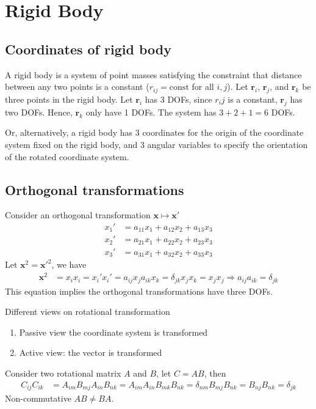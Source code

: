 \documentclass[twoside,9pt]{article}
\numberwithin{equation}{section} %
\theoremstyle{definition}
\theoremstyle{remark}
\begin{document}
\newpage 
\section{Rigid Body}
\subsection{Coordinates of rigid body}
A rigid body is a system of point masses satisfying the constraint that
distance between any two points is a constant ($r_{ij}=\text{const}$
for all $i,j$).
Let $\mathbf{r}_i$, $\mathbf{r}_j$, and $\mathbf{r}_k$
be three points in the rigid body.
Let $\mathbf{r}_i$ has $3$ DOFs, 
since $r_ij$ is a constant, $\mathbf{r}_j$ has two DOFs.
Hence, $\mathbf{r}_k$ only have 1 DOFs.
The system has $3+2+1=6$ DOFs.

Or, alternatively, a rigid body has 3 coordinates for the origin of the coordinate
system fixed on the rigid body, and 3 angular variables to specify the orientation
of the rotated coordinate system.

\subsection{Orthogonal transformations}
Consider an orthogonal transformation $\mathbf{x}\mapsto\mathbf{x}'$
\begin{align}
    x_1' &= a_{11}x_1 + a_{12}x_2 + a_{13}x_3\\
    x_2' &= a_{21}x_1 + a_{22}x_2 + a_{23}x_3\\
    x_3' &= a_{31}x_1 + a_{32}x_2 + a_{33}x_3
\end{align}
Let $\mathbf{x}^2=\mathbf{x'}^2$, we have
\begin{align}
    \mathbf{x}^2 &= x_ix_i
    = x_i' x_i'
    = a_{ij}x_j a_{ik}x_k
    = \delta_{jk}x_jx_k
    = x_jx_j
    \Rightarrow
    a_{ij}a_{ik} = \delta_{jk}
\end{align}
This equation implies the orthogonal transformations have three DOFs.

Different views on rotational transformation
\begin{enumerate}
    \item Passive view the coordinate system is transformed
    \item Active view: the vector is transformed
\end{enumerate}

Consider two rotational matrix $A$ and $B$, let $C=AB$,
then 
\begin{align}
    C_{ij}C_{ik} &= A_{im}B_{mj}A_{in}B_{nk}
    = A_{im}A_{in}B_{mk}B_{nk}
    = \delta_{nm}B_{mj}B_{nk}
    = B_{nj}B_{nk}
    = \delta_{jk}
\end{align}
Non-commutative $AB\neq BA$.
\end{document}
